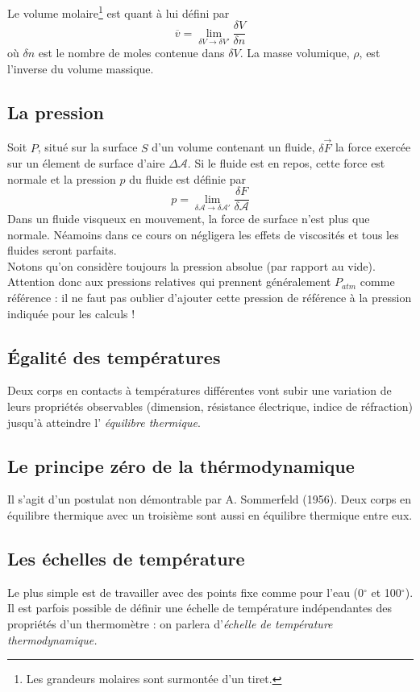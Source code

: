 	Le volume molaire\footnote{Les grandeurs molaires sont surmontée d'un 
	tiret.} est quant à lui défini par
	\begin{equation}
	\overline{v} = \lim\limits_{\delta V \rightarrow \delta V'} \frac{
	\delta V}{\delta n}
	\end{equation}
	où $\delta n$ est le nombre de moles contenue dans $\delta V$. La 
	masse volumique, $\rho$, est l'inverse du volume massique.
	
	
	\subsection{La pression}
	Soit $P$, situé sur la surface $S$ d'un volume contenant un fluide, 
	$\delta \vec F$ la force exercée sur un élement de surface d'aire 
	$\Delta \mathcal{A}$. Si le fluide est en repos, cette force est 
	normale et la pression $p$ du fluide est définie par
	\begin{equation}
	p = \lim\limits_{\delta\mathcal{A}\rightarrow\delta\mathcal{A}'} 
	\frac{\delta F}{\delta \mathcal{A}}
	\end{equation}		
	Dans un fluide visqueux en mouvement, la force de surface n'est 
	plus que normale. Néamoins dans ce cours on négligera les effets 
	de viscosités et tous les fluides seront parfaits.\\
	Notons qu'on considère toujours la pression absolue (par rapport 
	au vide). Attention donc aux pressions relatives qui prennent 
	généralement $P_{atm}$ comme référence : il ne faut pas oublier 
	d'ajouter cette pression de référence à la pression indiquée 
	pour les calculs !
	
	
	\subsection{Égalité des températures}
	Deux corps en contacts à températures différentes vont subir une 
	variation de leurs propriétés observables (dimension, résistance 
	électrique, indice de réfraction) jusqu'à atteindre l'\textit{
	équilibre thermique}.
	
	\subsection{Le principe zéro de la thérmodynamique}
	Il s'agit d'un postulat non démontrable par A. Sommerfeld (1956). 
	Deux corps en équilibre thermique avec un troisième sont aussi 
	en équilibre thermique entre eux.
	
	\subsection{Les échelles de température}
	Le plus simple est de travailler avec des points fixe comme pour 
	l'eau (0$^\circ$ et 100$^\circ$). Il est parfois possible de 
	définir une échelle de température indépendantes des propriétés 
	d'un thermomètre : on parlera d'\textit{échelle de température 
	thermodynamique.}
	
	
	
	
	
	
	
	
	
	
	
	
	
	
	
	
	
	
	
	
	
	
	
	
	
